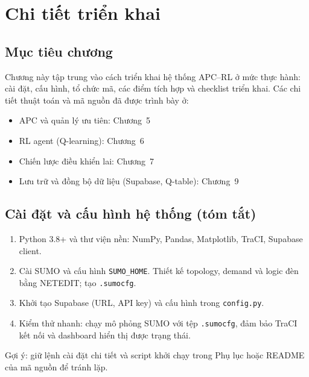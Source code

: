 \chapter{Chi tiết triển khai}

\section{Mục tiêu chương}
Chương này tập trung vào cách triển khai hệ thống APC–RL ở mức thực hành: cài đặt, cấu hình, tổ chức mã, các điểm tích hợp và checklist triển khai. Các chi tiết thuật toán và mã nguồn đã được trình bày ở:
\begin{itemize}
    \item APC và quản lý ưu tiên: Chương~5
    \item RL agent (Q-learning): Chương~6
    \item Chiến lược điều khiển lai: Chương~7
    \item Lưu trữ và đồng bộ dữ liệu (Supabase, Q-table): Chương~9
\end{itemize}

\section{Cài đặt và cấu hình hệ thống (tóm tắt)}
\begin{enumerate}
    \item Python 3.8+ và thư viện nền: NumPy, Pandas, Matplotlib, TraCI, Supabase client.
    \item Cài SUMO và cấu hình \texttt{SUMO\_HOME}. Thiết kế topology, demand và logic đèn bằng NETEDIT; tạo \texttt{.sumocfg}.
    \item Khởi tạo Supabase (URL, API key) và cấu hình trong \texttt{config.py}.
    \item Kiểm thử nhanh: chạy mô phỏng SUMO với tệp \texttt{.sumocfg}, đảm bảo TraCI kết nối và dashboard hiển thị được trạng thái.
\end{enumerate}
Gợi ý: giữ lệnh cài đặt chi tiết và script khởi chạy trong Phụ lục hoặc README của mã nguồn để tránh lặp.

